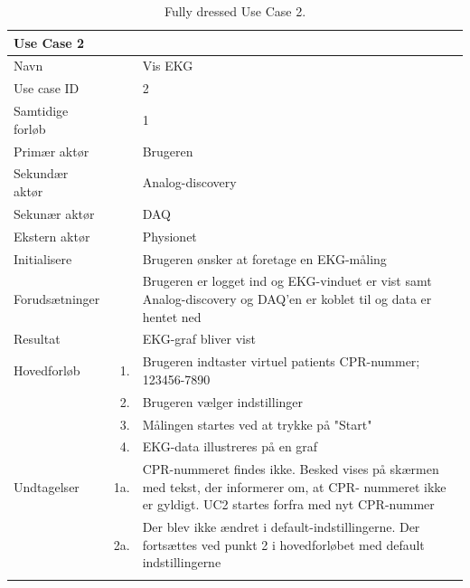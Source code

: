 \begin{longtabu} to  %
    {\large \textbf{Use Case 2}} && \\
    \toprule
    Navn &&    Vis EKG\\
    Use case ID &&    2\\
    Samtidige forløb &&    1\\
    Primær aktør &&    Brugeren\\
    Sekundær aktør &&	Analog-discovery\\
    Sekunær aktør &&	DAQ\\
    Ekstern aktør &&	Physionet\\
    Initialisere &&    Brugeren ønsker at foretage en EKG-måling\\
    Forudsætninger &&    Brugeren er logget ind og EKG-vinduet er vist samt Analog-discovery og DAQ'en er koblet til og data er hentet ned\\
    Resultat &&    EKG-graf bliver vist           \\ \midrule
    Hovedforløb &    1. &    Brugeren indtaster virtuel patients CPR-nummer; 123456-7890\\[-1ex]
    			&    2. &    Brugeren vælger indstillinger\\[-1ex]	
                &    3. &    Målingen startes ved at trykke på "Start"\\[-1ex]
                &    4. &    EKG-data illustreres på en graf\\ \midrule
                
    Undtagelser &    1a. &    CPR-nummeret findes ikke. Besked vises på 								skærmen med tekst, der informerer om, at CPR-						nummeret ikke er gyldigt. UC2 startes forfra 						med nyt CPR-nummer\\
    			&    2a. &    Der blev ikke ændret i default-indstillingerne. 				Der fortsættes ved punkt 2 i hovedforløbet med 				default indstillingerne
     \\ \bottomrule
\caption{Fully dressed Use Case 2.}
\label{UC2}
\end{longtabu}

